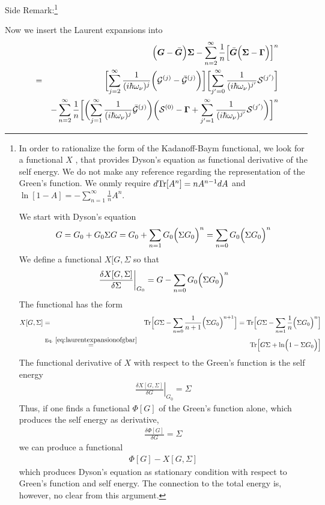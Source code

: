 \documentclass[11pt,a4paper]{report}
\begin{document}
Side Remark:\footnote{In order to rationalize the form of the
  Kadanoff-Baym functional, we look for a functional $X$ , that
  provides Dyson's equation as functional derivative of the self
  energy. We do not make any reference regarding the representation of
  the Green's function. We onmly require $d \mathrm{Tr}[A^n]=n A^{n-1}dA$ and
  $\ln[1-A]=-\sum_{n=1}^\infty \frac{1}{n}A^n$.

 We start with Dyson's equation
\begin{eqnarray}
G=G_{0}+G_0\Sigma G
=G_0+\sum_{n=1}G_0\Bigl(\Sigma G_0\Bigr)^n
=\sum_{n=0}G_0\Bigl(\Sigma G_0\Bigr)^n
\end{eqnarray}
We define a functional $X[G,\Sigma$ so that
\begin{eqnarray}
\left.\frac{\delta X[G,\Sigma]}{\delta\Sigma}\right|_{G_0}=
G-\sum_{n=0}G_0\Bigl(\Sigma G_0\Bigr)^n
\end{eqnarray}
The functional has the form
\begin{eqnarray}
X[G,\Sigma]
&=&\Tr\Bigl[G\Sigma-\sum_{n=0}\frac{1}{n+1} \Bigl(\Sigma G_0\Bigr)^{n+1}\Bigr]
=\Tr\Bigl[G\Sigma-\sum_{n=1}\frac{1}{n} \Bigl(\Sigma G_0\Bigr)^{n}\Bigr]
\nonumber\\
&\eqrel{eq:laurentexpansionofgbar}{=}&
\Tr\Bigl[G\Sigma+\ln\Bigl(1-\Sigma G_0\Bigr)\Bigr]
\end{eqnarray}
The functional derivative of $X$ with respect to the Green's function is the
self energy
\begin{eqnarray}
\left.\frac{\delta X[G,\Sigma]}{\delta G}\right|_{G_0}=
\Sigma 
\end{eqnarray}
Thus, if one finds a functional $\Phi[G]$ of the Green's function
alone, which produces the self energy as derivative,
\begin{eqnarray}
\frac{\delta \Phi[G]}{\delta G}=\Sigma
\end{eqnarray}
we can produce a functional
\begin{eqnarray}
\Phi[G]-X[G,\Sigma]
\end{eqnarray}
which produces Dyson's equation as stationary condition with respect
to Green's function and self energy. The connection to the total
energy is, however, no clear from this argument.  }

Now we insert the Laurent expansions into
\begin{eqnarray}
&&\Bigl(\bm{G}-\bar{\bm{G}}\Bigr)\bm{\Sigma}
-\sum_{n=2}^\infty\frac{1}{n}
\Bigl[\bar{\bm{G}}\Bigl(\bm{\Sigma}-\bm{\Gamma}\Bigr)\Bigr]^n
\nonumber\\
&=&
\biggl[
\sum_{j=2}^\infty\frac{1}{(i\hbar\omega_\nu)^j}
\biggl(\mathcal{\bm{G}}^{(j)}-\bar{\mathcal{\bm{G}}}^{(j)}
\biggr)
\biggr]
\biggl[
\sum_{j'=0}^\infty\frac{1}{(i\hbar\omega_\nu)^{j'}}
\mathcal{\bm{S}}^{(j')}
\biggr]
\nonumber\\
&&-
\sum_{n=2}^\infty\frac{1}{n}
\biggl[
\biggl(
\sum_{j=1}^\infty\frac{1}{(i\hbar\omega_\nu)^j}
\bar{\mathcal{\bm{G}}}^{(j)}
\biggr)
\biggl(\mathcal{\bm{S}}^{(0)}-\bm{\Gamma}
+\sum_{j'=1}^\infty\frac{1}{(i\hbar\omega_\nu)^{j'}}\mathcal{\bm{S}}^{(j')}
\biggl)
\biggr]^n
\end{eqnarray}
\end{document}
